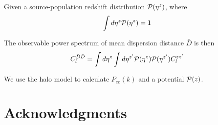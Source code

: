 \documentclass[twocolumn,prd,noshowpacs,nofootinbib,amsmath,amssymb]{revtex4}
\begin{document}
Given a source-population redshift distribution ${\cal P}(\eta^z)$, where 
\begin{equation}
\int d\eta^z {\cal P}(\eta^z) = 1
\end{equation}

The observable power spectrum of mean dispersion distance $\bar{D}$ is then
\begin{equation}
C_l^{\bar{D}\bar{D}} = \int d\eta^z \int d\eta^{z'} {\cal P}(\eta^z){\cal P}(\eta^{z'}) C_l^{z z'}
\end{equation}




We use the halo model to calculate $P_{ee}(k)$ and a potential ${\cal P}(z)$.


\bigskip
\section*{Acknowledgments}
\medskip

 


\end{document}
